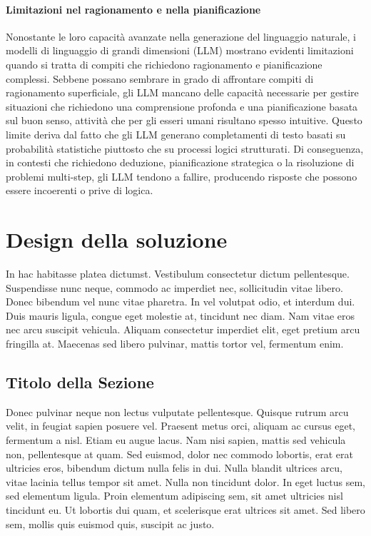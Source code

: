 \documentclass[target=mst,aauheader=,style=]{thud}
\begin{document}
\subsubsection{Limitazioni nel ragionamento e nella pianificazione}
Nonostante le loro capacità avanzate nella generazione del linguaggio naturale, i modelli di linguaggio di grandi dimensioni (LLM) mostrano evidenti limitazioni quando si tratta di compiti che richiedono ragionamento e pianificazione complessi. Sebbene possano sembrare in grado di affrontare compiti di ragionamento superficiale, gli LLM mancano delle capacità necessarie per gestire situazioni che richiedono una comprensione profonda e una pianificazione basata sul buon senso, attività che per gli esseri umani risultano spesso intuitive. Questo limite deriva dal fatto che gli LLM generano completamenti di testo basati su probabilità statistiche piuttosto che su processi logici strutturati. Di conseguenza, in contesti che richiedono deduzione, pianificazione strategica o la risoluzione di problemi multi-step, gli LLM tendono a fallire, producendo risposte che possono essere incoerenti o prive di logica.\cite{naveed_2024}

\chapter{Design della soluzione}
In hac habitasse platea dictumst. Vestibulum consectetur dictum pellentesque. Suspendisse nunc neque, commodo ac imperdiet nec, sollicitudin vitae libero. Donec bibendum vel nunc vitae pharetra. In vel volutpat odio, et interdum dui. Duis mauris ligula, congue eget molestie at, tincidunt nec diam. Nam vitae eros nec arcu suscipit vehicula. Aliquam consectetur imperdiet elit, eget pretium arcu fringilla at. Maecenas sed libero pulvinar, mattis tortor vel, fermentum enim.

\section{Titolo della Sezione}
Donec pulvinar neque non lectus vulputate pellentesque. Quisque rutrum arcu velit, in feugiat sapien posuere vel. Praesent metus orci, aliquam ac cursus eget, fermentum a nisl. Etiam eu augue lacus. Nam nisi sapien, mattis sed vehicula non, pellentesque at quam. Sed euismod, dolor nec commodo lobortis, erat erat ultricies eros, bibendum dictum nulla felis in dui. Nulla blandit ultrices arcu, vitae lacinia tellus tempor sit amet. Nulla non tincidunt dolor. In eget luctus sem, sed elementum ligula. Proin elementum adipiscing sem, sit amet ultricies nisl tincidunt eu. Ut lobortis dui quam, et scelerisque erat ultrices sit amet. Sed libero sem, mollis quis euismod quis, suscipit ac justo.
\end{document}
